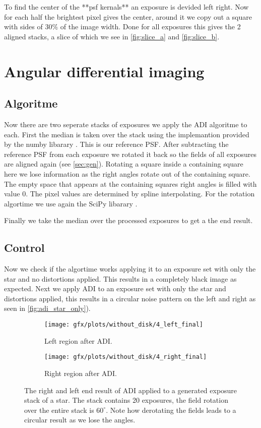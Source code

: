 To find the center of the **psf kernals** an exposure is devided left right. Now for each half the brightest pixel gives the center, around it we copy out a square with sides of $30\%$ of the image width. Done for all exposures this gives the 2 aligned stacks, a slice of which we see in \autoref{fig:slice_a} and \autoref{fig:slice_b}.

\section{Angular differential imaging}
\subsection{Algoritme}
Now there are two seperate stacks of exposures we apply the \ac{ADI} algoritme \cite{Marois_2006} to each. First the median is taken over the stack using the implemantion provided by the numby libarary \cite{numpy}. This is our reference \ac{PSF}. After subtracting the reference \ac{PSF} from each exposure we rotated it back so the fields of all exposures are aligned again (see \autoref{sec:gen}). Rotating a square inside a containing square here we lose information as the right angles rotate out of the containing square. The empty space that appears at the containing squares right angles is filled with value $0$. The pixel values are determined by spline interpolating. For the rotation algortime we use again the SciPy libarary \cite{scipy}.

Finally we take the median over the processed exposures to get a the end result.

\subsection{Control}
Now we check if the algortime works applying it to an exposure set with only the star and no distortions applied. This results in a completely black image as expected. Next we apply \ac{ADI} to an exposure set with only the star and distortions applied, this results in a circular noise pattern on the left and right as seen in \autoref{fig:adi_star_only}).

\begin{figure}[h!]
      \begin{subfigure}[b]{0.5\textwidth}
        \texttt{[image: gfx/plots/without\_disk/4\_left\_final]}
        \caption{Left region after \ac{ADI}.}
      \end{subfigure}%
      \begin{subfigure}[b]{0.5\textwidth}
        \texttt{[image: gfx/plots/without\_disk/4\_right\_final]}
        \caption{Right region after \ac{ADI}.}
      \end{subfigure}      

  \caption{The right and left end result of \ac{ADI} applied to a generated exposure stack of a star. The stack contains 20 exposures, the field rotation over the entire stack is $60^{\circ}$. Note how derotating the fields leads to a circular result as we lose the angles.}
  \label{fig:adi_star_only}
\end{figure}


